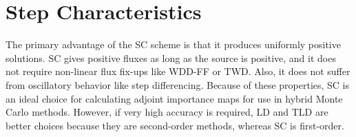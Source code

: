 \documentclass[12pt]{article}
\begin{document}
\section{Step Characteristics}
\label{sec:step-characteristics}

The primary advantage of the SC scheme is that it produces uniformly positive
solutions. SC gives positive fluxes as long as the source is positive, and it
does not require non-linear flux fix-ups like WDD-FF or TWD.  Also, it does
not suffer from oscillatory behavior like step differencing.  Because of these
properties, SC is an ideal choice for calculating adjoint importance maps for
use in hybrid Monte Carlo methods.  However, if very high accuracy is
required, LD and TLD are better choices because they are second-order methods,
whereas SC is first-order.
\end{document}
